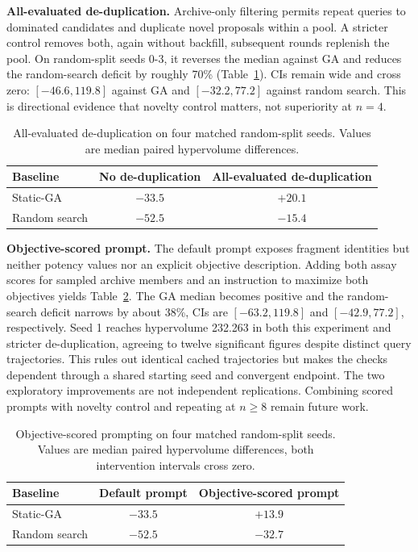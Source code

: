 \documentclass[11pt]{article}
\begin{document}
\textbf{All-evaluated de-duplication.} Archive-only filtering permits repeat queries to dominated candidates and duplicate novel proposals within a pool. A stricter control removes both, again without backfill, subsequent rounds replenish the pool. On random-split seeds 0-3, it reverses the median against GA and reduces the random-search deficit by roughly 70\% (Table~\ref{tab:strict-dedup}). CIs remain wide and cross zero: $[-46.6,119.8]$ against GA and $[-32.2,77.2]$ against random search. This is directional evidence that novelty control matters, not superiority at $n=4$.

\begin{table}[!htbp]
\caption{All-evaluated de-duplication on four matched random-split seeds. Values are median paired hypervolume differences.}
\label{tab:strict-dedup}
\centering
\begin{tabular}{@{}lcc@{}}
\toprule
Baseline & No de-duplication & All-evaluated de-duplication \\
\midrule
Static-GA & $-33.5$ & $+20.1$ \\
Random search & $-52.5$ & $-15.4$ \\
\bottomrule
\end{tabular}
\end{table}

\textbf{Objective-scored prompt.} The default prompt exposes fragment identities but neither potency values nor an explicit objective description. Adding both assay scores for sampled archive members and an instruction to maximize both objectives yields Table~\ref{tab:scored-prompt}. The GA median becomes positive and the random-search deficit narrows by about 38\%, CIs are $[-63.2,119.8]$ and $[-42.9,77.2]$, respectively. Seed 1 reaches hypervolume 232.263 in both this experiment and stricter de-duplication, agreeing to twelve significant figures despite distinct query trajectories. This rules out identical cached trajectories but makes the checks dependent through a shared starting seed and convergent endpoint. The two exploratory improvements are not independent replications. Combining scored prompts with novelty control and repeating at $n\ge8$ remain future work.

\begin{table}[!htbp]
\caption{Objective-scored prompting on four matched random-split seeds. Values are median paired hypervolume differences, both intervention intervals cross zero.}
\label{tab:scored-prompt}
\centering
\begin{tabular}{@{}lcc@{}}
\toprule
Baseline & Default prompt & Objective-scored prompt \\
\midrule
Static-GA & $-33.5$ & $+13.9$ \\
Random search & $-52.5$ & $-32.7$ \\
\bottomrule
\end{tabular}
\end{table}
\end{document}
